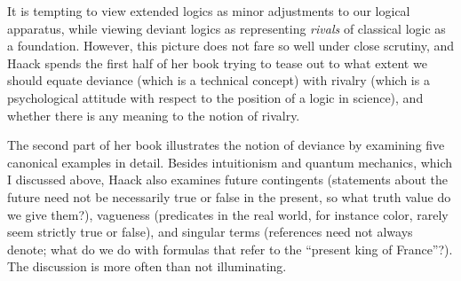 \documentclass[11pt]{article}
\newcommand{\<}{\langle}
\renewcommand{\>}{\rangle}
\begin{document}
It is tempting to view extended logics as minor adjustments to our
logical apparatus, while viewing deviant logics as representing
\emph{rivals} of classical logic as a foundation.
However, this picture does not fare so well under close scrutiny, and
Haack spends the first half of her book trying to tease out to what
extent we should equate deviance (which is a technical concept) with
rivalry (which is a psychological attitude with respect to the 
position of a logic in science), and whether there is any meaning to
the notion of rivalry.

The second part of her book illustrates the notion of deviance by
examining five canonical examples in detail.
Besides intuitionism and quantum mechanics, which I discussed above,
Haack also examines future contingents (statements about the future
need not be necessarily true or false in the present, so what truth
value do we give them?), vagueness (predicates in the real world, for
instance  color, rarely seem strictly true or false), and singular
terms (references need not always denote; what do we do with formulas
that refer to the ``present king of France''?).
The discussion is more often than not illuminating. 
\end{document}
